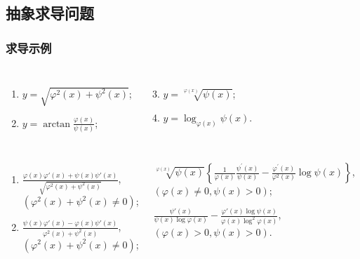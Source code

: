 \documentclass[
10pt,
aspectratio=43,
]{beamer}
\begin{document}
\subsection{抽象求导问题}
\begin{frame}
	\frametitle{求导示例}
	\everymath{\displaystyle}
	\begin{block}{}
		\begin{columns}[onlytextwidth]
			\begin{enumerate}
				\item $y=\sqrt{\varphi^2(x)+\psi^2(x)}$;
				\item $y=\arctan \frac{\varphi(x)}{\psi(x)}$;
			\end{enumerate}
			\begin{enumerate}
				\setcounter{enumi}{2}
				\item $y=\sqrt[\varphi(x)]{\psi(x)}$;
				\item $y=\log _{\varphi(x)} \psi(x)$.
			\end{enumerate}
		\end{columns}
	\end{block}

	\begin{exampleblock}{}
		\begin{columns}[onlytextwidth]
			\begin{enumerate}
				\pause
				\item $\displaystyle \frac{\varphi(x) \varphi'(x)+\psi(x) \psi'(x)}{\sqrt{\varphi^2(x)+\psi^2(x)}}$,\\\vspace{0.1cm}$\left(\varphi^2(x)+\psi^2(x) \neq 0\right)$;
				      \vspace{0.4cm}
					  \pause
				\item $\displaystyle \frac{\psi(x) \varphi'(x)-\varphi(x) \psi'(x)}{\varphi^2(x)+\psi^2(x)}$,\\\vspace{0.1cm}$\left(\varphi^2(x)+\psi^2(x) \neq 0\right)$;
			\end{enumerate}

			\begin{enumerate}
				\setcounter{enumi}{2}
				{
				\small
				\pause
				\item $\sqrt[\varphi(x)]{\psi(x)}\left\{\frac{1}{\varphi(x)} \frac{\psi^{\prime}(x)}{\psi(x)}-\frac{\varphi^{\prime}(x)}{\varphi^2(x)} \log \psi(x)\right\}$,\\\vspace{0.1cm}$(\varphi(x) \neq 0, \psi(x)>0)$;
				      }
				      \vspace{0.4cm}
					  \pause
				\item $\displaystyle \frac{\psi'(x)}{\psi(x) \log \varphi(x)}-\frac{\varphi'(x) \log \psi(x)}{\varphi(x) \log^2 \varphi(x)}$,\\\vspace{0.1cm}$(\varphi(x)>0, \psi(x)>0)$.
			\end{enumerate}


\end{columns}
\end{exampleblock}
\end{frame}
\end{document}
